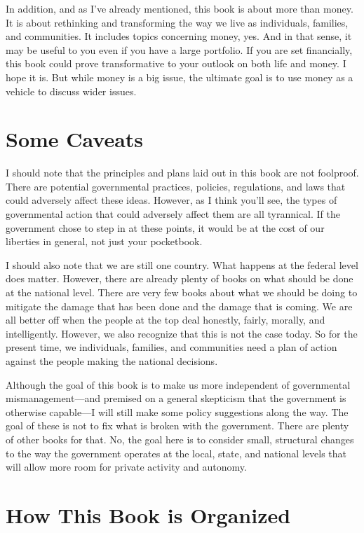 In addition, and
as I’ve already
mentioned, this book is about more than money. It is about rethinking
and transforming the way we live as individuals, families, and
communities. It includes topics concerning money, yes. And in that
sense, it may be useful to you even if you have a large portfolio. If
you are set financially, this book could prove transformative to your
outlook on both life and money.
I hope it is. But
while money is a big issue, the ultimate goal is to use money as a
vehicle to discuss wider issues. 

\section{Some Caveats}

I should note that the principles and plans laid out in this book are
not foolproof. There are potential governmental practices, policies,
regulations, and laws that could adversely affect these ideas. However,
as I think you’ll see, the types of governmental action that could
adversely affect them are all tyrannical. If the government chose to
step in at these points, it would be at the cost of our liberties in
general, not just your pocketbook. 


I should also note that we are still one country. What happens at the
federal level does matter. However, there are already plenty of books
on what should be done at the national level. There are very few books
about what we should be doing to mitigate the damage that has been done
and the damage that is coming. We are all better off when the people at
the top deal honestly, fairly, morally, and intelligently. However, we
also recognize that this is not the case today. So for the present
time, we individuals, families, and communities need a plan of action
against the people making the national decisions.


Although the goal of this book is to make us more independent of
governmental
mismanagement—and
premised on a general skepticism that the government is otherwise
capable—I will still make some policy suggestions along the way. The
goal of these is not to fix what is broken with the government. There
are plenty of other books for that. No, the goal here is to  consider
small, structural changes to the way the government operates at the
local, state, and national levels
that will allow more
room for private activity and autonomy.

\section{How This Book is Organized}

